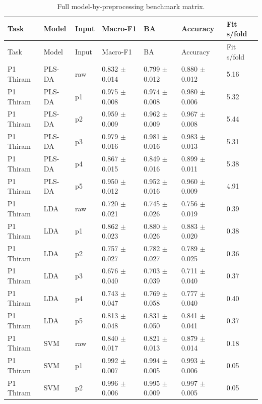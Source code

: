 {\tiny
\setlength{\tabcolsep}{2.5pt}
\renewcommand{\arraystretch}{1.08}
\begin{longtable}{L{2.35cm}L{2.4cm}L{1.0cm}L{2.35cm}L{2.25cm}L{2.25cm}L{1.45cm}}
\caption{Full model-by-preprocessing benchmark matrix.}\label{tab:s3_full_benchmark}\\
\toprule
Task & Model & Input & Macro-F1 & BA & Accuracy & Fit s/fold \\
\midrule
\endfirsthead
\toprule
Task & Model & Input & Macro-F1 & BA & Accuracy & Fit s/fold \\
\midrule
\endhead
\endfoot
\bottomrule
\endlastfoot
P1 Thiram & PLS-DA & raw & 0.832 $\pm$ 0.014 & 0.799 $\pm$ 0.012 & 0.880 $\pm$ 0.012 & 5.16 \\
P1 Thiram & PLS-DA & p1 & 0.975 $\pm$ 0.008 & 0.974 $\pm$ 0.008 & 0.980 $\pm$ 0.006 & 5.32 \\
P1 Thiram & PLS-DA & p2 & 0.959 $\pm$ 0.009 & 0.962 $\pm$ 0.009 & 0.967 $\pm$ 0.008 & 5.44 \\
P1 Thiram & PLS-DA & p3 & 0.979 $\pm$ 0.016 & 0.981 $\pm$ 0.016 & 0.983 $\pm$ 0.013 & 5.31 \\
P1 Thiram & PLS-DA & p4 & 0.867 $\pm$ 0.015 & 0.849 $\pm$ 0.016 & 0.899 $\pm$ 0.011 & 5.38 \\
P1 Thiram & PLS-DA & p5 & 0.950 $\pm$ 0.012 & 0.952 $\pm$ 0.016 & 0.960 $\pm$ 0.009 & 4.91 \\
P1 Thiram & LDA & raw & 0.720 $\pm$ 0.021 & 0.745 $\pm$ 0.026 & 0.756 $\pm$ 0.019 & 0.39 \\
P1 Thiram & LDA & p1 & 0.862 $\pm$ 0.023 & 0.880 $\pm$ 0.026 & 0.883 $\pm$ 0.020 & 0.38 \\
P1 Thiram & LDA & p2 & 0.757 $\pm$ 0.027 & 0.782 $\pm$ 0.027 & 0.789 $\pm$ 0.025 & 0.36 \\
P1 Thiram & LDA & p3 & 0.676 $\pm$ 0.040 & 0.703 $\pm$ 0.039 & 0.711 $\pm$ 0.040 & 0.37 \\
P1 Thiram & LDA & p4 & 0.743 $\pm$ 0.047 & 0.769 $\pm$ 0.058 & 0.777 $\pm$ 0.040 & 0.40 \\
P1 Thiram & LDA & p5 & 0.813 $\pm$ 0.048 & 0.831 $\pm$ 0.050 & 0.841 $\pm$ 0.041 & 0.37 \\
P1 Thiram & SVM & raw & 0.840 $\pm$ 0.017 & 0.821 $\pm$ 0.013 & 0.879 $\pm$ 0.014 & 0.18 \\
P1 Thiram & SVM & p1 & 0.992 $\pm$ 0.007 & 0.994 $\pm$ 0.005 & 0.993 $\pm$ 0.006 & 0.05 \\
P1 Thiram & SVM & p2 & 0.996 $\pm$ 0.006 & 0.995 $\pm$ 0.009 & 0.997 $\pm$ 0.005 & 0.05 \\

\end{longtable}}
